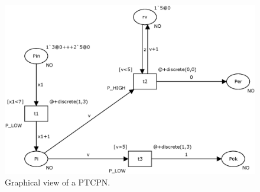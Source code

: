 \begin{figure}


\hspace*{1.0cm}
\includegraphics[width=11.5cm]{Figures/figure2_scp.eps}
% 
\caption{\label{red1}Graphical view of a PTCPN.}
\end{figure}


